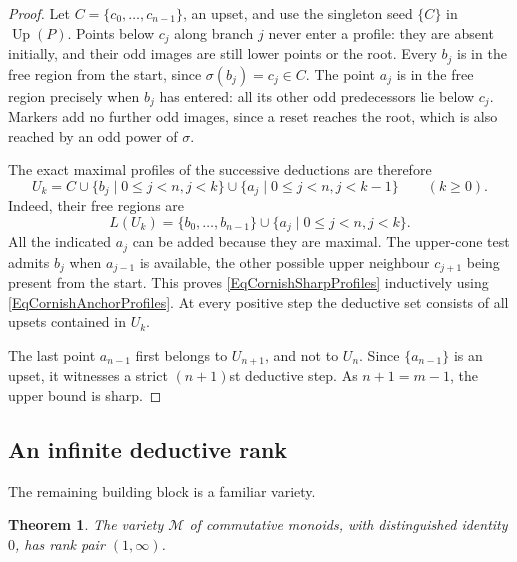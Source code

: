 \documentclass[12pt,english]{amsart}
\newtheorem{theorem}{Theorem}[section]
\theoremstyle{definition}
\numberwithin{equation}{section}
\theoremstyle{remark}
\begin{document}
\begin{proof}
Let $C=\{c_0,\ldots,c_{n-1}\}$, an upset, and use the singleton seed
$\{C\}$ in $\operatorname{Up}(P)$. Points below $c_j$ along branch
$j$ never enter a profile: they are absent initially, and their odd
images are still lower points or the root. Every $b_j$ is in the free
region from the start, since $\sigma(b_j)=c_j\in C$. The point $a_j$
is in the free region precisely when $b_j$ has entered: all its other
odd predecessors lie below $c_j$. Markers add no further odd images,
since a reset reaches the root, which is also reached by an odd power
of $\sigma$.

The exact maximal profiles of the successive deductions are therefore
\begin{equation}\label{EqCornishSharpProfiles}
U_k=C\cup\{b_j\mid 0\leqslant j<n, j<k\}
       \cup\{a_j\mid 0\leqslant j<n, j<k-1\}
\qquad(k\geqslant0).
\end{equation}
Indeed, their free regions are
\[
L(U_k)=\{b_0,\ldots,b_{n-1}\}
        \cup\{a_j\mid 0\leqslant j<n, j<k\}.
\]
All the indicated $a_j$ can be added because they are maximal. The
upper-cone test admits $b_j$ when $a_{j-1}$ is available, the other
possible upper neighbour $c_{j+1}$ being present from the start.
This proves \eqref{EqCornishSharpProfiles} inductively using
\eqref{EqCornishAnchorProfiles}. At every positive step the deductive
set consists of all upsets contained in $U_k$.

The last point $a_{n-1}$ first belongs to $U_{n+1}$, and not to $U_n$.
Since $\{a_{n-1}\}$ is an upset, it witnesses a strict $(n+1)$st
deductive step. As $n+1=m-1$, the upper bound is sharp.
\end{proof}

\subsection{An infinite deductive rank}\label{SubsecInfiniteDeduction}

The remaining building block is a familiar variety.

\begin{theorem}\label{ThmMonoids}
The variety $\mathcal M$ of commutative monoids, with distinguished identity $0$, has rank pair $(1,\infty)$.
\end{theorem}
\end{document}

